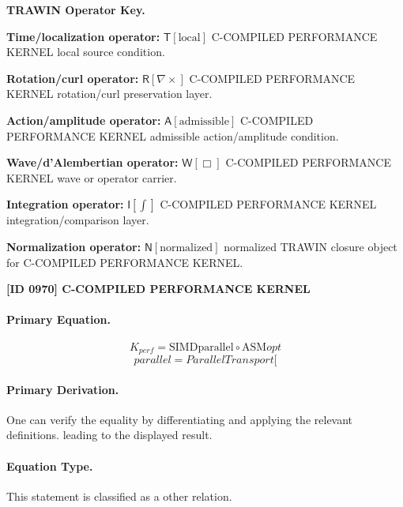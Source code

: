 \par\vspace{0.45\baselineskip}
\noindent\begin{minipage}[t]{\linewidth}
\begingroup
\small
\raggedright
\textbf{TRAWIN Operator Key.}\par
\noindent\textbf{Time/localization operator:} $\mathsf{T}\!\left[\mathrm{local}\right]$ C-COMPILED PERFORMANCE KERNEL local source condition.\par
\noindent\textbf{Rotation/curl operator:} $\mathsf{R}\!\left[\nabla\times\right]$ C-COMPILED PERFORMANCE KERNEL rotation/curl preservation layer.\par
\noindent\textbf{Action/amplitude operator:} $\mathsf{A}\!\left[\mathrm{admissible}\right]$ C-COMPILED PERFORMANCE KERNEL admissible action/amplitude condition.\par
\noindent\textbf{Wave/d'Alembertian operator:} $\mathsf{W}\!\left[\Box\right]$ C-COMPILED PERFORMANCE KERNEL wave or operator carrier.\par
\noindent\textbf{Integration operator:} $\mathsf{I}\!\left[\int\right]$ C-COMPILED PERFORMANCE KERNEL integration/comparison layer.\par
\noindent\textbf{Normalization operator:} $\mathsf{N}\!\left[\mathrm{normalized}\right]$ normalized TRAWIN closure object for C-COMPILED PERFORMANCE KERNEL.\par
\endgroup
\end{minipage}

\clearpage
\noindent\textbf{[ID 0970] C-COMPILED PERFORMANCE KERNEL}\par
\vspace{0.35em}
\paragraph{Primary Equation.}
\[
K_{perf} = \text{SIMD} {\mathrm{parallel}} \circ \text{ASM} {opt}
\]
\[
parallel = ParallelTransport[
\]

\paragraph{Primary Derivation.}
One can verify the equality by differentiating and applying the relevant definitions. leading to the displayed result.
\paragraph{Equation Type.}
This statement is classified as a other relation.

